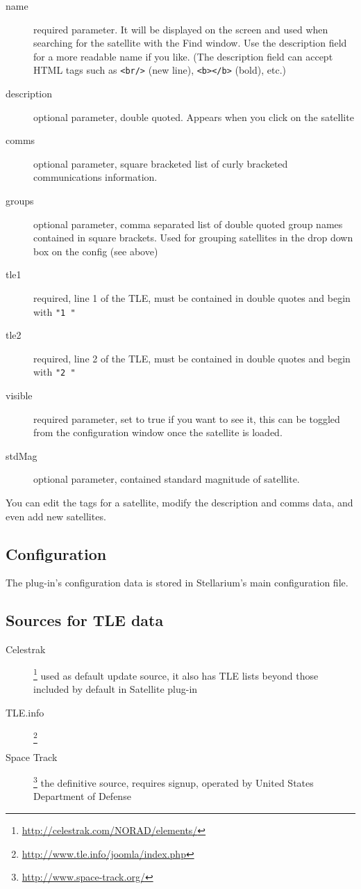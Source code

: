\begin{description}
\item[name] required parameter. It will be displayed on the screen and used
when searching for the satellite with the Find window. Use the
description field for a more readable name if you like. (The
description field can accept HTML tags such as \texttt{<br/>} (new line), \texttt{<b></b>} (bold), etc.)

\item[description] optional parameter, double quoted. Appears when you click on the satellite \item[comms] optional parameter, square bracketed list of curly bracketed communications information.
\item[groups]  optional parameter, comma separated list of double quoted group names contained in square brackets. Used for grouping satellites in the drop down box on the config (see above)
\item[tle1]  required, line 1 of the TLE, must be contained in double quotes and begin with \texttt{"1~"}
\item[tle2]  required, line 2 of the TLE, must be contained in double quotes and begin with \texttt{"2~"}
\item[visible]  required parameter, set to true if you want to see it, this can be toggled from the configuration window once the satellite is loaded. 
\item[stdMag]  optional parameter, contained standard magnitude of satellite. 
\end{description}
You can edit the tags for a satellite, modify the description and comms data, and even add new satellites. 

\subsection{Configuration}
\label{sec:plugins:Satellites:configuration}

The plug-in's configuration data is stored in Stellarium's main configuration
file.


\subsection{Sources for TLE data}

\begin{description}
\item[Celestrak]\footnote{\url{http://celestrak.com/NORAD/elements/}} used as default update source, it also has TLE lists
  beyond those included by default in Satellite plug-in
\item[TLE.info]\footnote{\url{http://www.tle.info/joomla/index.php}}
\item[Space Track]\footnote{\url{http://www.space-track.org/}} the definitive source, requires signup, operated by
  United States Department of Defense
\end{description}


